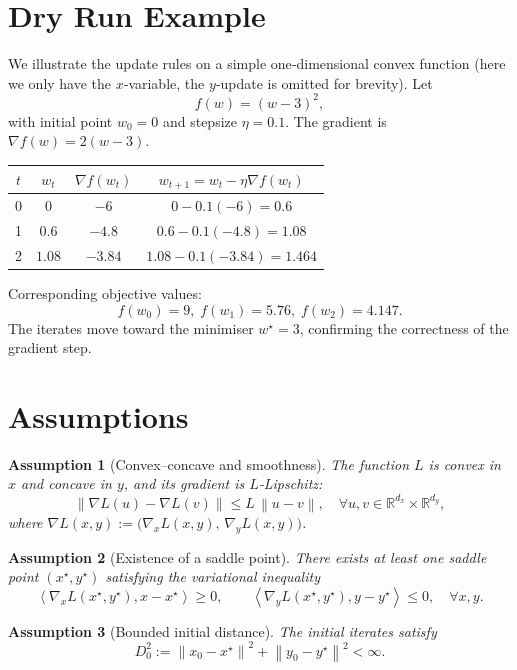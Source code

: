 \documentclass{article}
\newtheorem{assumption}{Assumption}
\newcommand{\norm}[1]{\left\lVert#1\right\rVert}
\newcommand{\inner}[2]{\left\langle #1,#2\right\rangle}
\begin{document}
\section*{Dry Run Example}
We illustrate the update rules on a simple one‑dimensional convex function (here we only have the $x$‑variable, the $y$‑update is omitted for brevity).  
Let 
\[
f(w)=(w-3)^2,
\]
with initial point $w_0=0$ and stepsize $\eta=0.1$.  
The gradient is $\nabla f(w)=2(w-3)$.  

\begin{center}
\begin{tabular}{c|c|c|c}
$t$ & $w_t$ & $\nabla f(w_t)$ & $w_{t+1}=w_t-\eta\nabla f(w_t)$\\\hline
0 & $0$ & $-6$ & $0-0.1(-6)=0.6$\\
1 & $0.6$ & $-4.8$ & $0.6-0.1(-4.8)=1.08$\\
2 & $1.08$ & $-3.84$ & $1.08-0.1(-3.84)=1.464$\\
\end{tabular}
\end{center}
Corresponding objective values:
\[
f(w_0)=9,\; f(w_1)=5.76,\; f(w_2)=4.147.
\]
The iterates move toward the minimiser $w^{\star}=3$, confirming the correctness of the gradient step.

\newpage
\section*{Assumptions}
\begin{assumption}[Convex–concave and smoothness]\label{assump:smooth}
The function $L$ is convex in $x$ and concave in $y$, and its gradient is $L$‑Lipschitz:
\[
\norm{\nabla L(u)-\nabla L(v)}\le L\,\norm{u-v},
\quad\forall u,v\in\mathbb{R}^{d_x}\times\mathbb{R}^{d_y},
\]
where $\nabla L(x,y) := \big(\nabla_x L(x,y),\,\nabla_y L(x,y)\big)$.
\end{assumption}
\begin{assumption}[Existence of a saddle point]\label{assump:saddle}
There exists at least one saddle point $(x^{\star},y^{\star})$ satisfying the variational inequality
\[
\inner{\nabla_x L(x^{\star},y^{\star})}{x-x^{\star}}\ge 0,\qquad
\inner{\nabla_y L(x^{\star},y^{\star})}{y-y^{\star}}\le 0,
\quad\forall x,y.
\]
\end{assumption}
\begin{assumption}[Bounded initial distance]\label{assump:bound}
The initial iterates satisfy
\[
D_0^2:=\norm{x_0-x^{\star}}^2+\norm{y_0-y^{\star}}^2<\infty .
\]
\end{assumption}
\end{document}
